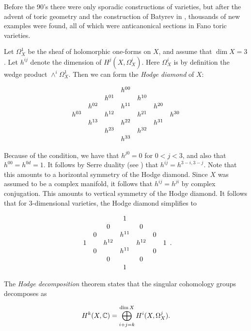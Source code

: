 Before the 90's there were only sporadic constructions of \CY varieties, but after the advent of toric geometry and the construction of Batyrev in \cite{batyrev_mirrorsymmetry}, thousands of new examples were found, all of which were anticanonical sections in Fano toric varieties. 

Let $\Omega_X^1$ be the sheaf of holomorphic one-forms on $X$, and assume that $\dim X =3$. Let $h^{ij}$ denote the dimension of $H^j(X,\Omega_X^i)$. Here $\Omega_X^i$ is by definition the wedge product $\wedge^i \Omega_X^1$.  Then we can form the \emph{Hodge diamond} of $X$:

\[
\begin{array}[c]{ccccccc}
&&&               h^{00} \\  
 &         & h^{01} & & h^{10}  \\
&	h^{02} && h^{11}  && h^{20}  \\
   h^{03} && h^{12} && h^{21} && h^{30} \\
&	h^{13} && h^{22}  && h^{31}  \\
 &         & h^{23} & & h^{32}  \\
                &&& h^{33} 
\end{array}
\]

Because of the \CY condition, we have that $h^{j0}=0$ for $0 < j < 3$, and also that $h^{00}=h^{0d}=1$. It follows by Serre duality (see \cite[Corollary 7.7, Chapter III]{hartshorne}) that $h^{ij}=h^{3-i,3-j}$. Note that this amounts to a horizontal symmetry of the Hodge diamond. Since $X$ was assumed to be a complex manifold, it follows that $h^{ij}=h^{ji}$ by complex conjugation. This amounts to vertical symmetry of the Hodge diamond. It follows that for 3-dimensional \CY varieties, the Hodge diamond simplifies to

\[
\begin{array}[c]{ccccccc}
&&& 1 \\  
 &         & 0 & & 0  \\
&	0 && h^{11}  && 0  \\
1 && h^{12} && h^{12} && 1 \\
&	0 && h^{11}  && 0  \\
 &         & 0 & & 0  \\
 &&& 1 
\end{array}.
\]

The \emph{Hodge decomposition} theorem \cite[page 142]{voison_cg} states that the singular cohomology groups decomposes as

$$
H^k(X,\mathbb{C}) = \bigoplus_{i+j=k}^{\dim X} H^i(X,\Omega_X^j).
$$

